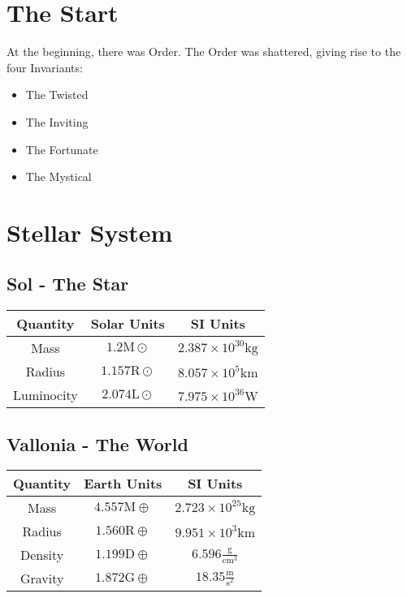 \documentclass[
a4paper,
10pt,
twoside,
]{article}
\begin{document}
\titleinf
\maketitle
\startmcols

\section{The Start}

At the beginning, there was Order.
The Order was shattered, giving rise to the four Invariants:
\begin{itemize}
	\item The Twisted
	\item The Inviting
	\item The Fortunate
	\item The Mystical
\end{itemize}

\section{Stellar System}

\subsection{Sol - The Star}

\begin{table}[H]
	\centering
	\begin{tabular}{c|c|c}
		Quantity & Solar Units & SI Units \\\hline
		Mass & $1.2\text{M}\odot$ & $2.387\times 10^{30}\text{kg}$\\
		Radius & $1.157\text{R}\odot$ & $8.057\times 10^5\text{km}$\\
		Luminocity & $2.074\text{L}\odot$ & $7.975\times 10^{36}\text{W}$
	\end{tabular}
\end{table}

\subsection{Vallonia - The World}

\begin{table}[H]
	\centering
	\begin{tabular}{c|c|c}
		Quantity & Earth Units & SI Units \\\hline
		Mass & $4.557\text{M}\oplus$ & $2.723\times 10^{25}\text{kg}$\\
		Radius & $1.560\text{R}\oplus$ & $9.951\times 10^3\text{km}$\\
		Density & $1.199\text{D}\oplus$ & $6.596\frac{\text{g}}{\text{cm}^3}$\\
		Gravity & $1.872\text{G}\oplus$ & $18.35\frac{\text{m}}{\text{s}^2}$
	\end{tabular}
\end{table}
\end{document}
